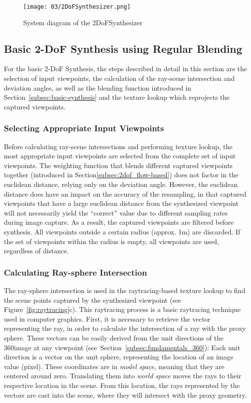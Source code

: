 \begin{figure}
		\centering
		\texttt{[image: 03/2DoFSynthesizer.png]}
		\caption{System diagram of the 2DoFSynthesizer}
		\label{fig:2DoFSynthesizer}
\end{figure}

\subsection{Basic 2-DoF Synthesis using Regular Blending}
For the basic 2-DoF Synthesis, the steps described in detail in this section are the selection of input viewpoints, the calculation of the ray-scene intersection and deviation angles, as well as the blending function introduced in Section~\ref{subsec:basic-synthesis} and the texture lookup which reprojects the captured viewpoints.

\subsubsection{Selecting Appropriate Input Viewpoints}
Before calculating ray-scene intersections and performing texture lookup, the most appropriate input viewpoints are selected from the complete set of input viewpoints.
The weighting function that blends different captured viewpoints together (introduced in Section\ref{subsec:2dof_flow-based}) does not factor in the euclidean distance, relying only on the deviation angle. However, the euclidean distance does have an impact on the accuracy of the resampling, in that captured viewpoints that have a large euclidean distance from the synthesized viewpoint will not necessarily yield the ``correct'' value due to different sampling rates during image capture.
As a result, the captured viewpoints are filtered before synthesis. All viewpoints outside a certain radius (approx. 1m) are discarded. If the set of viewpoints within the radius is empty, all viewpoints are used, regardless of distance.

\subsubsection{Calculating Ray-sphere Intersection}
The ray-sphere intersection is used in the raytracing-based texture lookup to find the scene points captured by the synthesized viewpoint (see Figure~\ref{fig:raytracing}c). This raytracing process is a basic raytracing technique used in computer graphics. First, it is necessary to retrieve the vector representing the ray, in order to calculate the intersection of a ray with the proxy sphere. These vectors can be easily derived from the unit directions of the 360\degree image at any viewpoint (see~Section~\ref{subsec:fundamentals_360}): Each unit direction is a vector on the unit sphere, representing the location of an image value (pixel). These coordinates are in \emph{model space}, meaning that they are centered around zero. Translating them into \emph{world space} moves the rays to their respective location in the scene. From this location, the rays represented by the vectors are cast into the scene, where they will intersect with the proxy geometry.

